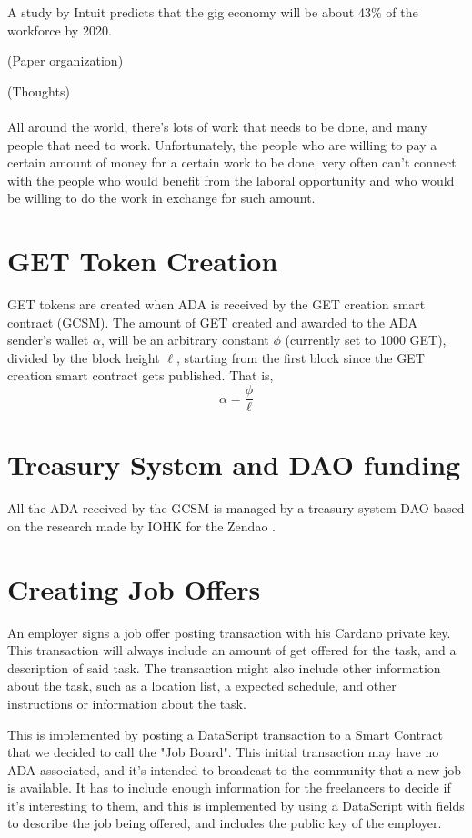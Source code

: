 \documentclass{article}
\begin{document}
A study by Intuit predicts that the gig economy will be about 43\% of the workforce by 2020.

(Paper organization)

(Thoughts)
\paragraph{} All around the world, there's lots of work that needs to be done, and many people that need to work. Unfortunately, the people who are willing to pay a certain amount of money for a certain work to be done, very often can't connect with the people who would benefit from the laboral opportunity and who would be willing to do the work in exchange for such amount.

\section{GET Token Creation}
GET tokens are created when ADA is received by the GET creation smart contract (GCSM).
The amount of GET created and awarded to the ADA sender's wallet $\alpha$, will be an arbitrary constant $\phi$ (currently set to 1000 GET), divided by the block height $\ell$, starting from the first block since the GET creation smart contract gets published. That is,
\[ \alpha
  = \dfrac{\phi}{\ell}
\]

\section{Treasury System and DAO funding}
All the ADA received by the GCSM is managed by a treasury system DAO based on the research made by IOHK for the Zendao \cite{zhangb2}.
 
\section{Creating Job Offers}
An employer signs a job offer posting transaction with his Cardano private key. This transaction will always include an amount of get offered for the task, and a description of said task. The transaction might also include other information about the task, such as a location list, a expected schedule, and other instructions or information about the task.

This is implemented by posting a DataScript transaction to a Smart Contract that we decided to call the "Job Board". This initial transaction may have no ADA associated, and it's intended to broadcast to the community that a new job is available. It has to include enough information for the freelancers to decide if it's interesting to them, and this is implemented by using a DataScript with fields to describe the job being offered, and includes the public key of the employer.
\end{document}
